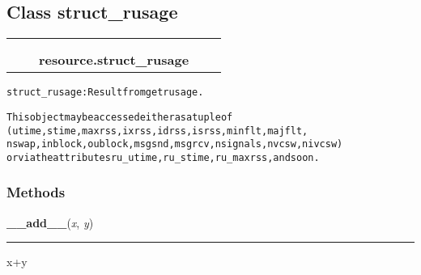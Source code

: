

\subsection{Class struct\_rusage}

    \label{resource:struct_rusage}
\begin{tabular}{cccccc}
\multicolumn{2}{r}{\settowidth{\BCL}{object}\multirow{2}{\BCL}{object}}
&&
  \\\cline{3-3}
  &&\multicolumn{1}{c|}{}
&&
  \\
&&\multicolumn{2}{l}{\textbf{resource.struct\_rusage}}
\end{tabular}

\begin{alltt}
struct\_rusage: Result from getrusage.

This object may be accessed either as a tuple of
    (utime,stime,maxrss,ixrss,idrss,isrss,minflt,majflt,
    nswap,inblock,oublock,msgsnd,msgrcv,nsignals,nvcsw,nivcsw)
or via the attributes ru\_utime, ru\_stime, ru\_maxrss, and so on.
\end{alltt}



  \subsubsection{Methods}

    \label{resource:struct_rusage:__add__}

    \vspace{0.5ex}

\hspace{.8\funcindent}\begin{boxedminipage}{\funcwidth}

    \raggedright \textbf{\_\_add\_\_}(\textit{x}, \textit{y})

    \vspace{-1.5ex}

    \rule{\textwidth}{0.5\fboxrule}
\setlength{\parskip}{2ex}
    x+y

\setlength{\parskip}{1ex}
    \end{boxedminipage}

